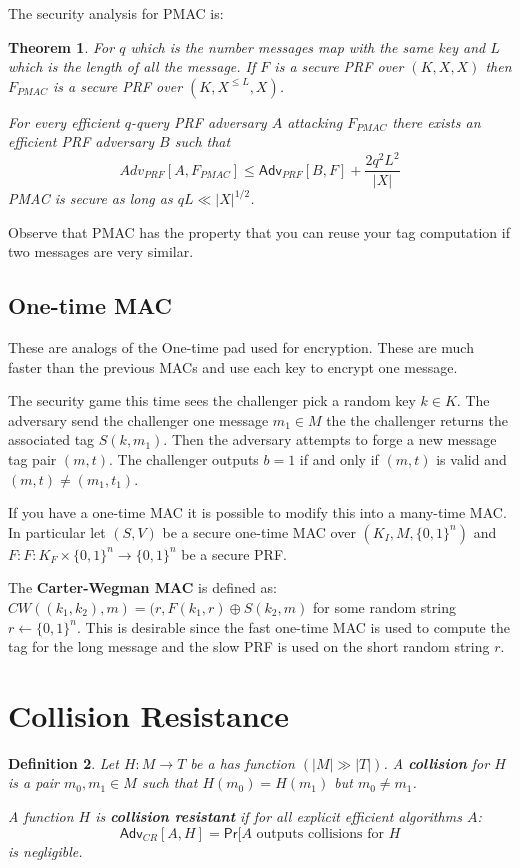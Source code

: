 \documentclass[twoside]{article}
\newcounter{lecnum}
\newtheorem{theorem}{Theorem}[lecnum]
\newtheorem{definition}[theorem]{Definition}
\def\Pr{\mathsf{Pr}}
\def\Adv{\mathsf{Adv}}
\def\xor{\oplus}
\begin{document}
The security analysis for PMAC is:
\begin{theorem}
For $q$ which is the number messages map with the same key and $L$ which is the length of all the message. If $F$ is a secure PRF over $(K, X, X)$ then $F_{PMAC}$ is a secure PRF over $(K, X^{\leq L}, X)$.

For every efficient $q$-query PRF adversary $A$ attacking $F_{PMAC}$ there exists an efficient PRF adversary $B$ such that 
\[Adv_{PRF}[A, F_{PMAC}]\leq \Adv_{PRF}[B, F] + \frac{2q^2L^2}{|X|}\]
PMAC is secure as long as $qL \ll |X|^{1/2}$.
\end{theorem}

Observe that PMAC has the property that you can reuse your tag computation if two messages are very similar. 

\subsection{One-time MAC}
These are analogs of the One-time pad used for encryption. These are much faster than the previous MACs and use each key to encrypt one message.

The security game this time sees the challenger pick a random key $k \in K$. The adversary send the challenger one message $m_1 \in M$ the the challenger returns the associated tag $S(k, m_1)$. Then the adversary attempts to forge a new message tag pair $(m, t)$. The challenger outputs $b = 1$ if and only if $(m,t)$ is valid and $(m, t) \neq (m_1, t_1)$.

If you have a one-time MAC it is possible to modify this into a many-time MAC. In particular let $(S, V)$ be a secure one-time MAC over $(K_{I}, M, \{0,1\}^n)$ and $F: F: K_F \times \{0,1\}^n \rightarrow \{0,1\}^n$ be a secure PRF.

The \textbf{Carter-Wegman MAC} is defined as: $CW\left((k_1, k_2), m\right) = (r, F(k_1, r)\xor S(k_2, m)$ for some random string $r \leftarrow \{0,1\}^n$. This is desirable since the fast one-time MAC is used to compute the tag for the long message and the slow PRF is used on the short random string $r$. 

\section{Collision Resistance}

\begin{definition}
Let $H: M \rightarrow T$ be a has function $(|M| \gg |T|)$. A \textbf{collision} for $H$ is a pair $m_0, m_1 \in M$ such that $H(m_0) = H(m_1)$ but $m_0 \neq m_1$. 

A function $H$ is \textbf{collision resistant} if for all \emph{explicit} efficient algorithms $A$:
\[\Adv_{CR}[A, H] = \Pr[A \mbox{ outputs collisions for }H\]
is negligible. 
\end{definition}
\end{document}
